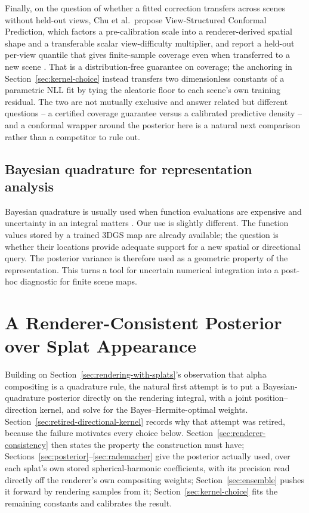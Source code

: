 \documentclass[letterpaper,10pt,conference]{ieeeconf}
\begin{document}
Finally, on the question of whether a fitted correction transfers across
scenes without held-out views, Chu et al.\ propose View-Structured Conformal
Prediction, which factors a pre-calibration scale into a renderer-derived
spatial shape and a transferable scalar view-difficulty multiplier, and
report a held-out per-view quantile that gives finite-sample coverage even
when transferred to a new scene \cite{chu2026conformal}. That is a
distribution-free guarantee on coverage; the anchoring in
Section~\ref{sec:kernel-choice} instead transfers two dimensionless
constants of a parametric NLL fit by tying the aleatoric floor to each
scene's own training residual. The two are not mutually exclusive and answer
related but different questions -- a certified coverage guarantee versus a
calibrated predictive density -- and a conformal wrapper around the
posterior here is a natural next comparison rather than a competitor to rule
out.


\subsection{Bayesian quadrature for representation analysis}

Bayesian quadrature is usually used when function evaluations are expensive
and uncertainty in an integral matters \cite{ohagan1991,briol2019}. Our use is
slightly different. The function values stored by a trained 3DGS map are
already available; the question is whether their locations provide adequate
support for a new spatial or directional query. The posterior variance is
therefore used as a geometric property of the representation. This turns a
tool for uncertain numerical integration into a post-hoc diagnostic for
finite scene maps.

\section{A Renderer-Consistent Posterior over Splat Appearance}
\label{sec:method}

Building on Section~\ref{sec:rendering-with-splats}'s observation that
alpha compositing is a quadrature rule, the natural first attempt is to put
a Bayesian-quadrature posterior directly on the rendering integral, with a
joint position--direction kernel, and solve for the Bayes--Hermite-optimal
weights. Section~\ref{sec:retired-directional-kernel} records why that
attempt was retired, because the failure motivates every choice below.
Section~\ref{sec:renderer-consistency} then states the property the
construction must have; Sections~\ref{sec:posterior}--\ref{sec:rademacher}
give the posterior actually used, over each splat's own stored
spherical-harmonic coefficients, with its precision read directly off the
renderer's own compositing weights; Section~\ref{sec:ensemble} pushes it
forward by rendering samples from it; Section~\ref{sec:kernel-choice} fits
the remaining constants and calibrates the result.
\end{document}
